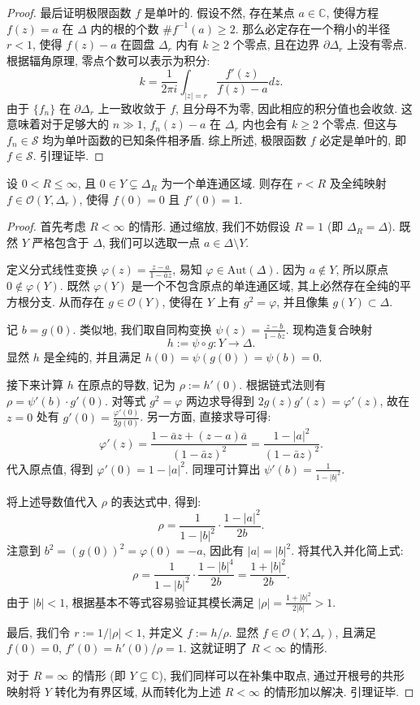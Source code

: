 \begin{proof}
最后证明极限函数 $f$ 是单叶的. 假设不然, 存在某点 $a \in \mathbb{C}$, 使得方程 $f(z) = a$ 在 $\Delta$ 内的根的个数 $\# f^{-1}(a) \geqslant 2$. 那么必定存在一个稍小的半径 $r < 1$, 使得 $f(z)-a$ 在圆盘 $\Delta_r$ 内有 $k \geqslant 2$ 个零点, 且在边界 $\partial \Delta_r$ 上没有零点. 根据辐角原理, 零点个数可以表示为积分:
\[ k = \frac{1}{2\pi i} \int_{|z|=r} \frac{f'(z)}{f(z)-a} dz. \]
由于 $\{f_n\}$ 在 $\partial \Delta_r$ 上一致收敛于 $f$, 且分母不为零, 因此相应的积分值也会收敛. 这意味着对于足够大的 $n \gg 1$, $f_n(z)-a$ 在 $\Delta_r$ 内也会有 $k \geqslant 2$ 个零点. 但这与 $f_n \in \mathcal{S}$ 均为单叶函数的已知条件相矛盾. 综上所述, 极限函数 $f$ 必定是单叶的, 即 $f \in \mathcal{S}$. 引理证毕.
\end{proof}

\begin{lemma}\label{3.3.6}
设 $0 < R \leqslant \infty$, 且 $0 \in Y \subsetneq \Delta_R$ 为一个单连通区域. 则存在 $r < R$ 及全纯映射 $f \in \mathcal{O}(Y, \Delta_r)$, 使得 $f(0)=0$ 且 $f'(0)=1$.
\end{lemma}

\begin{proof}
首先考虑 $R < \infty$ 的情形. 通过缩放, 我们不妨假设 $R=1$ (即 $\Delta_R = \Delta$). 既然 $Y$ 严格包含于 $\Delta$, 我们可以选取一点 $a \in \Delta \setminus Y$.

定义分式线性变换 $\varphi(z) = \frac{z-a}{1-\bar{a}z}$, 易知 $\varphi \in \mathrm{Aut}(\Delta)$. 因为 $a \notin Y$, 所以原点 $0 \notin \varphi(Y)$. 既然 $\varphi(Y)$ 是一个不包含原点的单连通区域, 其上必然存在全纯的平方根分支. 从而存在 $g \in \mathcal{O}(Y)$, 使得在 $Y$ 上有 $g^2 = \varphi$, 并且像集 $g(Y) \subset \Delta$.

记 $b = g(0)$. 类似地, 我们取自同构变换 $\psi(z) = \frac{z-b}{1-\bar{b}z}$. 现构造复合映射
\[ h := \psi \circ g : Y \to \Delta. \]
显然 $h$ 是全纯的, 并且满足 $h(0) = \psi(g(0)) = \psi(b) = 0$.

接下来计算 $h$ 在原点的导数, 记为 $\rho := h'(0)$. 根据链式法则有 $\rho = \psi'(b) \cdot g'(0)$. 对等式 $g^2 = \varphi$ 两边求导得到 $2g(z)g'(z) = \varphi'(z)$, 故在 $z=0$ 处有 $g'(0) = \frac{\varphi'(0)}{2g(0)}$. 另一方面, 直接求导可得:
\[ \varphi'(z) = \frac{1-\bar{a}z + (z-a)\bar{a}}{(1-\bar{a}z)^2} = \frac{1-|a|^2}{(1-\bar{a}z)^2}. \]
代入原点值, 得到 $\varphi'(0) = 1-|a|^2$. 同理可计算出 $\psi'(b) = \frac{1}{1-|b|^2}$. 

将上述导数值代入 $\rho$ 的表达式中, 得到:
\[ \rho = \frac{1}{1-|b|^2} \cdot \frac{1-|a|^2}{2b}. \]
注意到 $b^2 = (g(0))^2 = \varphi(0) = -a$, 因此有 $|a| = |b|^2$. 将其代入并化简上式:
\[ \rho = \frac{1}{1-|b|^2} \cdot \frac{1-|b|^4}{2b} = \frac{1+|b|^2}{2b}. \]
由于 $|b| < 1$, 根据基本不等式容易验证其模长满足 $|\rho| = \frac{1+|b|^2}{2|b|} > 1$. 

最后, 我们令 $r := 1/|\rho| < 1$, 并定义 $f := h/\rho$. 显然 $f \in \mathcal{O}(Y, \Delta_r)$, 且满足 $f(0)=0$, $f'(0) = h'(0)/\rho = 1$. 这就证明了 $R < \infty$ 的情形.

对于 $R = \infty$ 的情形 (即 $Y \subsetneq \mathbb{C}$), 我们同样可以在补集中取点, 通过开根号的共形映射将 $Y$ 转化为有界区域, 从而转化为上述 $R < \infty$ 的情形加以解决. 引理证毕.
\end{proof}



